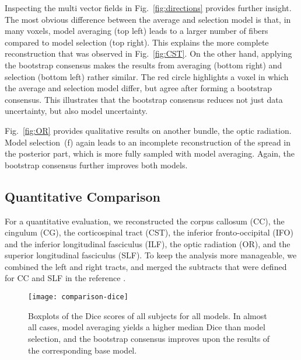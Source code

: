Inspecting the multi vector fields in Fig.~\ref{fig:directions} provides further insight. The most obvious difference between the average and
selection model is that, in many voxels, model averaging (top left) leads to a larger number of fibers compared to model selection (top right). This explains the more complete reconstruction that was observed in Fig.~\ref{fig:CST}. 
On the other hand, applying the bootstrap consensus makes the results from averaging (bottom right) and selection (bottom left) rather similar. The red circle highlights a voxel in which the average and selection model differ, but agree after forming a bootstrap consensus. This illustrates that the bootstrap consensus reduces not just data uncertainty, but also model uncertainty.

Fig.~\ref{fig:OR} provides qualitative results on another bundle, the optic radiation. Model selection~(f) again leads to an incomplete reconstruction of the spread in the posterior part, which is more fully sampled with model averaging. Again, the bootstrap consensus further improves both models.

\subsection{Quantitative Comparison}

For a quantitative evaluation, we reconstructed the corpus callosum (CC), the
cingulum (CG), the corticospinal tract (CST), the inferior fronto-occipital (IFO)
and the inferior longitudinal fasciculus (ILF), the optic radiation (OR), and
the superior longitudinal fasciculus (SLF). To keep the analysis more manageable, we combined the left and right tracts, and merged the subtracts that were defined for CC and SLF in the reference \cite{WASSERTHAL2018239}.

\begin{figure}
	\centering
	\texttt{[image: comparison-dice]}
	\caption{Boxplots of the Dice scores of all subjects for all models. In almost all cases, model averaging yields a higher median Dice than model selection, and the bootstrap consensus improves upon the results of the corresponding base model.}
	\label{fig:Dice}
\end{figure}

